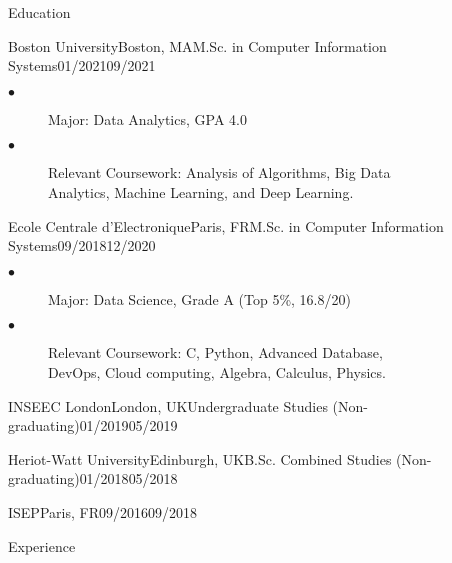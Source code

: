 \documentclass{resume}
\begin{document}
	\begin{multicols}{2}

	\begin{rSection}{\Large Education}
		\begin{school}{Boston University}{Boston, MA}{M.Sc. in Computer Information Systems}{01/2021}{09/2021}{
			\begin{description}
				\item[$\bullet$]Major:  Data Analytics, GPA 4.0
				\item[$\bullet$]{Relevant Coursework: Analysis of Algorithms, Big Data \\ Analytics, Machine Learning, and Deep Learning.}
			\end{description}
		}
		\end{school}
		\begin{school}{Ecole Centrale d'Electronique}{Paris, FR}{M.Sc. in Computer Information Systems}{09/2018}{12/2020}{
			\begin{description}
				\item[$\bullet$]Major: Data Science, Grade A  (Top 5\%, 16.8/20)
				\item[$\bullet$]{Relevant Coursework: C, Python, Advanced Database, \\ DevOps, Cloud computing, Algebra, Calculus, Physics.
				}
			\end{description}
		}
		\end{school}
		\begin{school}{INSEEC London}{London, UK}{Undergraduate Studies (Non-graduating)}{01/2019}{05/2019}{}
		\end{school}
		\begin{school}{Heriot-Watt University}{Edinburgh, UK}{B.Sc. Combined Studies (Non-graduating)}{01/2018}{05/2018}{}
		\end{school}
            \begin{school}{ISEP}{Paris, FR}{}{09/2016}{09/2018}{}
		\end{school}
	\end{rSection}

	\begin{rSection}{\Large Experience}
	

\end{rSection}
\end{multicols}
\end{document}
